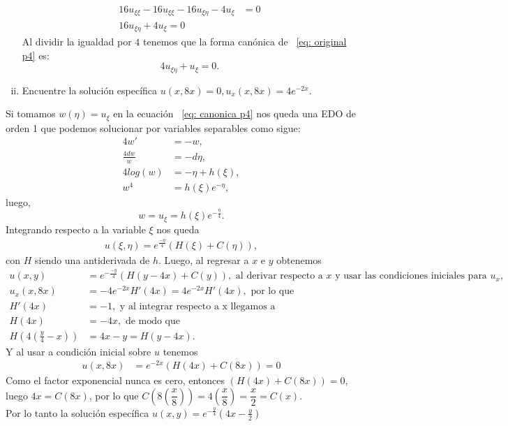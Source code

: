 \begin{homeworkProblem}
\begin{enumerate}[(i)]
\begin{solucion}
\begin{align*}
            16u_{\xi \xi} - 16u_{\xi \xi} -16u_{\xi \eta} - 4u_{\xi} &=0\\
            16u_{\xi \eta} + 4u_{\xi} = 0
        \end{align*}
            Al dividir la igualdad por $4$ tenemos que la forma canónica de ~\ref{eq: original p4} es:
            \begin{equation}
                \label{eq: canonica p4}
                4u_{\xi \eta} + u_{\xi} = 0.
            \end{equation}   
        \demostrado
\end{solucion}
\newpage
    \item Encuentre la solución específica $u(x,8x) = 0, u_{x}(x,8x)=4e^{-2x}$.
\end{enumerate}
\begin{solucion}
    Si tomamos $w(\eta) = u_{\xi}$ en la ecuación ~\ref{eq: canonica p4} nos queda una EDO de orden 1 que podemos solucionar por variables separables como sigue:
    \begin{align*}
        4w' &= -w,\\
        \frac{4dw}{w} &= -d\eta,\\
        4log(w) &= -\eta + h(\xi),\\
        w^{4} &= h(\xi)e^{-\eta},
        \end{align*}
        luego,
        \begin{equation}
            \label{eq: kja}
            w = u_{\xi} = h(\xi)e^{-\frac{\eta}{4}}.
        \end{equation}
    Integrando respecto a la variable $\xi$ nos queda
    \begin{align*}
        u(\xi, \eta)  =e^{\frac{-\eta}{4}}(H(\xi) + C(\eta)),
    \end{align*}
    con $H$ siendo una antiderivada de $h$. Luego, al regresar a $x$ e $y$ obtenemos
    \begin{align*}
        u(x,y) &= e^{-\frac{-y}{4}}(H(y-4x) + C(y)), \text{  al derivar respecto a } x \text{ y usar las condiciones iniciales para $u_{x} $,}\\
        u_{x}(x,8x) &= -4e^{-2x}H'(4x) = 4e^{-2x}H'(4x), \text{ por lo que }\\
        H'(4x) &= -1, \text{ y al integrar respecto a x llegamos a }\\
        H(4x) &= -4x, \text{ de modo que}\\
        H\left(4 (\frac{y}{4} - x)\right) &= 4x - y = H(y-4x).
    \end{align*}
    Y al usar a condición inicial sobre $u$ tenemos
    \begin{align*}
        u(x,8x) &= e^{-2x}(H(4x) + C(8x)) = 0
    \end{align*}
    Como el factor exponencial nunca es cero, entonces $(H(4x) + C(8x)) = 0$, luego $4x = C(8x)$, por lo que $C\left(8(\dfrac{x}{8})\right) = 4\left(\dfrac{x}{8}\right) = \dfrac{x}{2} = C(x)$.\\

    Por lo tanto la solución específica $u(x,y) = e^{-\frac{y}{4}}(4x -  \frac{y}{2})$
    \demostrado
\end{solucion}
\end{homeworkProblem}
